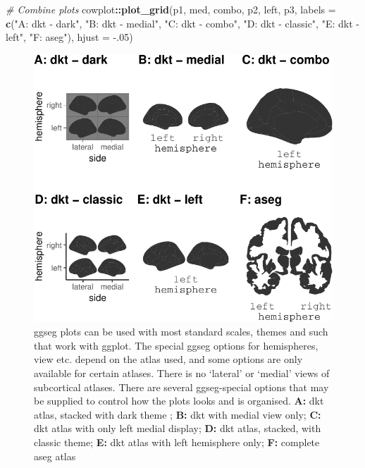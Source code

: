 \documentclass[fleqn,10pt]{wlpeerj} %
\newenvironment{Shaded}{\begin{snugshade}}{\end{snugshade}}
\newcommand{\CommentTok}[1]{\textcolor[rgb]{0.56,0.35,0.01}{\textit{#1}}}
\newcommand{\DataTypeTok}[1]{\textcolor[rgb]{0.13,0.29,0.53}{#1}}
\newcommand{\FloatTok}[1]{\textcolor[rgb]{0.00,0.00,0.81}{#1}}
\newcommand{\KeywordTok}[1]{\textcolor[rgb]{0.13,0.29,0.53}{\textbf{#1}}}
\newcommand{\NormalTok}[1]{#1}
\newcommand{\OperatorTok}[1]{\textcolor[rgb]{0.81,0.36,0.00}{\textbf{#1}}}
\newcommand{\StringTok}[1]{\textcolor[rgb]{0.31,0.60,0.02}{#1}}
\begin{document}
\begin{Shaded}
\begin{Highlighting}[]
\CommentTok{# Combine plots}
\NormalTok{cowplot}\OperatorTok{::}\KeywordTok{plot_grid}\NormalTok{(p1, med, combo,  p2, left, p3,}
                   \DataTypeTok{labels =} \KeywordTok{c}\NormalTok{(}\StringTok{"A: dkt - dark"}\NormalTok{, }\StringTok{"B: dkt - medial"}\NormalTok{,}
                              \StringTok{"C: dkt - combo"}\NormalTok{, }\StringTok{"D: dkt - classic"}\NormalTok{,}
                              \StringTok{"E: dkt - left"}\NormalTok{, }\StringTok{"F: aseg"}\NormalTok{),}
                   \DataTypeTok{hjust =} \FloatTok{-.05}\NormalTok{)}
\end{Highlighting}
\end{Shaded}

\begin{figure}
\centering
\includegraphics{draft_2_files/figure-latex/collection-1.pdf}
\caption{\label{fig:collection}ggseg plots can be used with most standard scales, themes and such that work with ggplot. The special ggseg options for hemispheres, view etc. depend on the atlas used, and some options are only available for certain atlases. There is no `lateral' or `medial' views of subcortical atlases. There are several ggseg-special options that may be supplied to control how the plots looks and is organised. \textbf{A:} dkt atlas, stacked with dark theme ; \textbf{B:} dkt with medial view only; \textbf{C:} dkt atlas with only left medial display; \textbf{D:} dkt atlas, stacked, with classic theme; \textbf{E:} dkt atlas with left hemisphere only; \textbf{F:} complete aseg atlas}
\end{figure}
\end{document}
